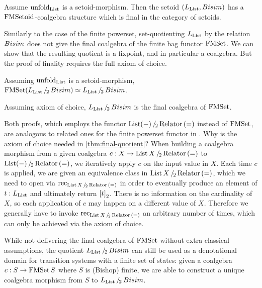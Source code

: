 \documentclass[a4paper,USenglish,cleveref]{lipics-v2021}
\begin{document}
\begin{theorem}\label{thm:final-setoids}
  Assume $\coalg{\List}$ is a setoid-morphism.
  Then the setoid $(\Lim{\List},\Bisim)$ has a $\Op{FMSetoid}$-coalgebra structure which is final in the category of setoids.
\end{theorem}

Similarly to the case of the finite powerset, set-quotienting $\Lim{\List}$ by the relation $\Bisim$ does not give the final coalgebra of the finite bag functor $\FMSet$. We can show that the resulting quotient is a fixpoint, and in particular a coalgebra. But the proof of finality requires the full axiom of choice. 
\begin{theorem}\label{thm:fixpoint-quotient}
  Assuming $\coalg{\List}$ is a setoid-morphism,
  $\FMSet(\SetQuot[\Lim{\List}][\Bisim]) \simeq \SetQuot[\Lim{\List}][\Bisim]$.
\end{theorem}
\begin{theorem}\label{thm:final-quotient}
  Assuming axiom of choice, $\SetQuot[\Lim{\List}][\Bisim]$ is the final coalgebra of $\FMSet$.
\end{theorem}
Both proofs, which employs the functor $\SetQuot[\List (-)][\Relator\,(=)]$ instead of $\FMSet$, are analogous to related ones for the finite powerset functor in \cite{Veltri2021}.
Why is the axiom of choice needed in \cref{thm:final-quotient}? When building a coalgebra morphism from a given coalgebra $c : X \to \SetQuot[\List X][\Relator\,(=)]$ to $\SetQuot[\List (-)][\Relator\,(=)]$, we iteratively apply $c$ on the input value in $X$. Each time $c$ is applied, we are given an equivalence class in $\SetQuot[\List X][\Relator\,(=)]$, which we need to open via $\Rec{\SetQuot[\List X][\Relator\,(=)]}$ in order to eventually produce an element of $t : \Lim{\List}$ and ultimately return $\SetQuotCon[t]$. There is no information on the
cardinality of $X$, so each application of $c$ may happen on a different
value of $X$. Therefore we generally have to invoke $\Rec{\SetQuot[\List X][\Relator\,(=)]}$ an arbitrary number of times,
which can only be achieved via the axiom of choice.


While not delivering the final coalgebra of $\FMSet$ without extra classical assumptions, the quotient $\SetQuot[\Lim{\List}][\Bisim]$ can still be used as a denotational domain for transition systems with a finite set of states: given a coalgebra $c : S \to \FMSet S$ where $S$ is (Bishop) finite, we are able to construct a unique coalgebra morphism from $S$ to $\SetQuot[\Lim{\List}][\Bisim]$.
\end{document}
